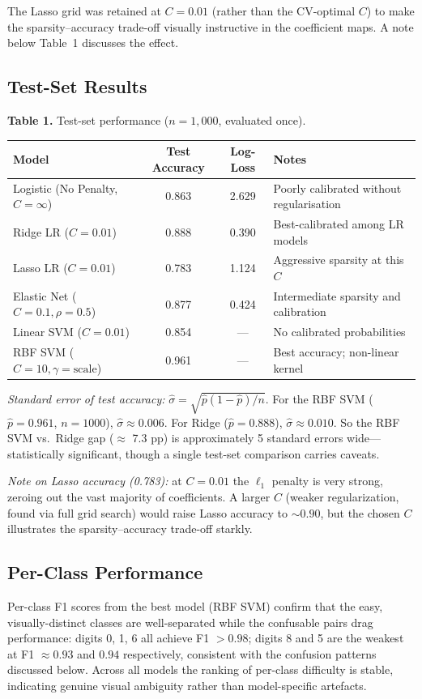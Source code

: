 \documentclass[10pt, letterpaper]{article}
\begin{document}
The Lasso grid was retained at $C = 0.01$ (rather than the CV-optimal $C$) to make the sparsity--accuracy trade-off visually instructive in the coefficient maps. A note below Table~1 discusses the effect.

\subsection{Test-Set Results}

\begin{center}\small
\textbf{Table 1.} Test-set performance ($n = 1{,}000$, evaluated once).\\[4pt]
\renewcommand{\arraystretch}{1.2}
\begin{tabular}{@{}lccl@{}}
\toprule
Model & Test Accuracy & Log-Loss & Notes \\
\midrule
Logistic (No Penalty, $C = \infty$) & 0.863 & 2.629 & Poorly calibrated without regularisation \\
Ridge LR ($C = 0.01$) & 0.888 & 0.390 & Best-calibrated among LR models \\
Lasso LR ($C = 0.01$) & 0.783 & 1.124 & Aggressive sparsity at this $C$ \\
Elastic Net ($C = 0.1, \rho = 0.5$)  & 0.877 & 0.424 & Intermediate sparsity and calibration \\
Linear SVM ($C = 0.01$) & 0.854 & --- & No calibrated probabilities \\
RBF SVM ($C = 10, \gamma = \text{scale}$) & 0.961 & --- & Best accuracy; non-linear kernel \\
\bottomrule
\end{tabular}
\end{center}

\emph{Standard error of test accuracy:} $\hat{\sigma} = \sqrt{\hat{p}(1 - \hat{p})/n}$. For the RBF SVM ($\hat{p} = 0.961$, $n = 1000$), $\hat{\sigma} \approx 0.006$. For Ridge ($\hat{p} = 0.888$), $\hat{\sigma} \approx 0.010$. So the RBF SVM vs.\ Ridge gap ($\approx$ 7.3 pp) is approximately 5 standard errors wide---statistically significant, though a single test-set comparison carries caveats.

\emph{Note on Lasso accuracy (0.783):} at $C = 0.01$ the $\ell_1$ penalty is very strong, zeroing out the vast majority of coefficients. A larger $C$ (weaker regularization, found via full grid search) would raise Lasso accuracy to $\sim 0.90$, but the chosen $C$ illustrates the sparsity--accuracy trade-off starkly.

\subsection{Per-Class Performance}
Per-class F1 scores from the best model (RBF SVM) confirm that the easy, visually-distinct classes are well-separated while the confusable pairs drag performance: digits 0, 1, 6 all achieve F1 $> 0.98$; digits 8 and 5 are the weakest at F1 $\approx 0.93$ and $0.94$ respectively, consistent with the confusion patterns discussed below. Across all models the ranking of per-class difficulty is stable, indicating genuine visual ambiguity rather than model-specific artefacts.
\end{document}
